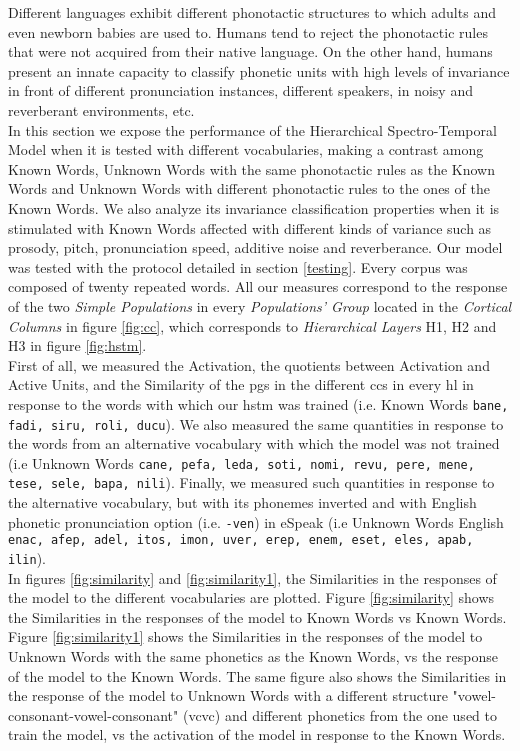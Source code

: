 \documentclass[11pt,a4paper]{article}
\begin{document}
Different languages exhibit different phonotactic structures to which adults
and even newborn babies are used to.
Humans tend to reject the phonotactic rules that were not acquired from their
native language.
On the other hand, humans present an innate capacity to classify phonetic units with
high levels of invariance in front of different pronunciation instances,
different speakers, in noisy and reverberant environments, etc.\\

In this section we expose the performance of the Hierarchical Spectro-Temporal Model
when it is tested with different vocabularies, making a contrast among Known Words,
Unknown Words with the same phonotactic rules as the Known Words and
Unknown Words with different phonotactic rules to the ones of the
Known Words.
We also analyze its invariance classification properties when it is stimulated
with Known Words affected with different kinds of variance such as
prosody, pitch, pronunciation speed, additive noise and reverberance.
Our model was tested with the protocol detailed in section \ref{testing}.
Every corpus was composed of twenty repeated words.
All our measures correspond to the response of the two \textit{Simple Populations} in every
\textit{Populations' Group} located in the \textit{Cortical Columns} in figure \ref{fig:cc},
which corresponds to \textit{Hierarchical Layers} H1, H2 and H3 in figure \ref{fig:hstm}.\\ 

First of all, we measured the Activation, the quotients between Activation and Active Units,
and the Similarity of the \ac{pg}s in the different \ac{cc}s in every \ac{hl} in response
to the words with which our \ac{hstm} was trained (i.e. Known Words \texttt{bane, fadi, siru, roli, ducu}).
We also measured the same quantities in response to the words from an alternative vocabulary with which
the model was not trained (i.e Unknown Words \texttt{cane, pefa, leda, soti, nomi, revu, pere, mene, tese, sele, bapa, nili}).
Finally, we measured such quantities in response to the alternative vocabulary, but with its phonemes inverted and with
English phonetic pronunciation option (i.e. \texttt{-ven}) in eSpeak
(i.e Unknown Words English \texttt{enac, afep, adel, itos, imon, uver, erep, enem, eset, eles, apab, ilin}).\\

In figures \ref{fig:similarity} and \ref{fig:similarity1}, the Similarities
in the responses of the model to the different vocabularies are plotted.
Figure \ref{fig:similarity} shows the Similarities in the responses of the model to Known Words
vs Known Words.
Figure \ref{fig:similarity1} shows the Similarities in the responses of the model to Unknown Words with the same
phonetics as the Known Words, vs the response of the model to the Known Words.
The same figure also shows the Similarities in the response of the model to Unknown Words with a different
structure "vowel-consonant-vowel-consonant" (\ac{vcvc}) and different phonetics from the one used to train the model,
vs the activation of the model in response to the Known Words.\\
\end{document}
